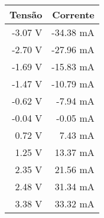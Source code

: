\begin{tabular}{rr}
\toprule
  Tensão &   Corrente \\
\midrule
 -3.07 V &  -34.38 mA \\
 -2.70 V &  -27.96 mA \\
 -1.69 V &  -15.83 mA \\
 -1.47 V &  -10.79 mA \\
 -0.62 V &   -7.94 mA \\
 -0.04 V &   -0.05 mA \\
  0.72 V &    7.43 mA \\
  1.25 V &   13.37 mA \\
  2.35 V &   21.56 mA \\
  2.48 V &   31.34 mA \\
  3.38 V &   33.32 mA \\
\bottomrule
\end{tabular}
